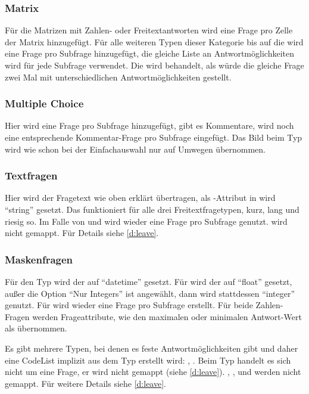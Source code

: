 \subsubsection{Matrix}

Für die Matrizen mit Zahlen- oder Freitextantworten wird eine Frage pro Zelle der Matrix hinzugefügt.
Für alle weiteren Typen dieser Kategorie bis auf die  wird eine Frage pro Subfrage hinzugefügt, die gleiche Liste an Antwortmöglichkeiten wird für jede Subfrage verwendet.
Die  wird behandelt, als würde die gleiche Frage zwei Mal mit unterschiedlichen Antwortmöglichkeiten gestellt.

\subsubsection{Multiple Choice}

Hier wird eine Frage pro Subfrage hinzugefügt, gibt es Kommentare, wird noch eine entsprechende Kommentar-Frage pro Subfrage eingefügt.
Das Bild beim Typ  wird wie schon bei der Einfachauswahl nur auf Umwegen übernommen.

\subsubsection{Textfragen}

Hier wird der Fragetext wie oben erklärt übertragen, als -Attribut in  wird \enquote{string} gesetzt.
Das funktioniert für alle drei Freitextfragetypen, kurz, lang und riesig so.
Im Falle von  und  wird wieder eine Frage pro Subfrage genutzt.
 wird nicht gemappt. Für Details siehe \cref{d:leave}.

\subsubsection{Maskenfragen}

Für den Typ  wird der  auf \enquote{datetime} gesetzt.
Für  wird der  auf \enquote{float} gesetzt, außer die Option \enquote{Nur Integers} ist angewählt, dann wird stattdessen \enquote{integer} genutzt.
Für  wird wieder eine Frage pro Subfrage erstellt.
Für beide Zahlen-Fragen werden Frageattribute, wie den maximalen oder minimalen Antwort-Wert als  übernommen.

Es gibt mehrere Typen, bei denen es feste Antwortmöglichkeiten gibt und daher eine CodeList implizit aus dem Typ erstellt wird:
, .
Beim Typ  handelt es sich nicht um eine Frage, er wird nicht gemappt (siehe \cref{d:leave}).
, ,  und  werden nicht gemappt. Für weitere Details siehe \cref{d:leave}.

